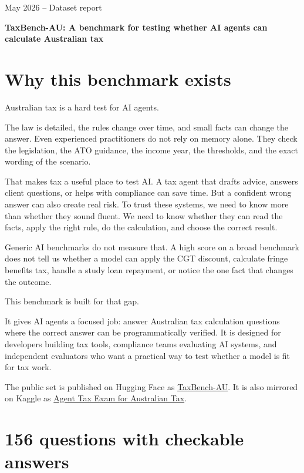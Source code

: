 \documentclass[11pt]{article}
\begin{document}
{\small\color{muted}May 2026 -- Dataset report}

\vspace{0.8em}

{\LARGE\bfseries TaxBench-AU: A benchmark for testing whether AI agents can calculate Australian tax\par}

\section{Why this benchmark exists}

Australian tax is a hard test for AI agents.

The law is detailed, the rules change over time, and small facts can change the answer. Even experienced practitioners do not rely on memory alone. They check the legislation, the ATO guidance, the income year, the thresholds, and the exact wording of the scenario.

That makes tax a useful place to test AI. A tax agent that drafts advice, answers client questions, or helps with compliance can save time. But a confident wrong answer can also create real risk. To trust these systems, we need to know more than whether they sound fluent. We need to know whether they can read the facts, apply the right rule, do the calculation, and choose the correct result.

Generic AI benchmarks do not measure that. A high score on a broad benchmark does not tell us whether a model can apply the CGT discount, calculate fringe benefits tax, handle a study loan repayment, or notice the one fact that changes the outcome.

This benchmark is built for that gap.

It gives AI agents a focused job: answer Australian tax calculation questions where the correct answer can be programmatically verified. It is designed for developers building tax tools, compliance teams evaluating AI systems, and independent evaluators who want a practical way to test whether a model is fit for tax work.

The public set is published on Hugging Face as \href{https://huggingface.co/datasets/Pn101/taxbench-au}{TaxBench-AU}. It is also mirrored on Kaggle as \href{https://www.kaggle.com/datasets/poonam101test/australian-tax-mcq-benchmark}{Agent Tax Exam for Australian Tax}.

\section{156 questions with checkable answers}
\end{document}
